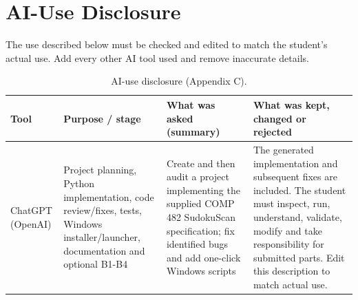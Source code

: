 \documentclass[conference]{IEEEtran}
\begin{document}
\section{AI-Use Disclosure}
The use described below must be checked and edited to match the student's actual use. Add every other AI tool used and remove inaccurate details.
\begin{table}[t]
\centering
\caption{AI-use disclosure (Appendix C).}
\begin{tabularx}{\textwidth}{p{2.2cm} p{2.4cm} X X}
\toprule
Tool & Purpose / stage & What was asked (summary) & What was kept, changed or rejected \\
\midrule
ChatGPT (OpenAI) & Project planning, Python implementation, code review/fixes, tests, Windows installer/launcher, documentation and optional B1-B4 & Create and then audit a project implementing the supplied COMP 482 SudokuScan specification; fix identified bugs and add one-click Windows scripts & The generated implementation and subsequent fixes are included. The student must inspect, run, understand, validate, modify and take responsibility for submitted parts. Edit this description to match actual use. \\
\bottomrule
\end{tabularx}
\end{table}
\end{document}
